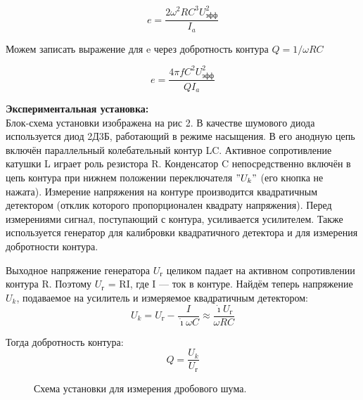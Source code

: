 \documentclass[a4paper, 12pt]{article}%
\begin{document}
	\begin{equation}
		e = \frac{2\omega^2RC^3U_{\text{эфф}}^2}{I_a}
	\end{equation}
	
	Можем записать выражение для e через добротность контура $Q = 1/\omega RC$
	
	\begin{equation}
		e = \frac{4\pi f C^2U_{\text{эфф}}^2}{QI_a}
	\end{equation}
	
	\textbf{Экспериментальная установка: }\\
	
	Блок-схема установки изображена на рис 2. В качестве шумового диода используется диод 2Д3Б, работающий в режиме насыщения. В его
	анодную цепь включён параллельный колебательный контур LC. Активное сопротивление катушки L играет роль резистора R. Конденсатор C непосредственно включён в цепь контура при нижнем положении
	переключателя $"U_k"$ (его кнопка не нажата). Измерение напряжения
	на контуре производится квадратичным детектором (отклик которого
	пропорционален квадрату напряжения). Перед измерениями сигнал, поступающий с контура, усиливается усилителем. Также используется генератор для калибровки квадратичного детектора и для измерения добротности контура.
	
	Выходное напряжение генератора $U_{\text{г}}$ целиком падает на активном сопротивлении контура R. Поэтому $U_{\text{г}}$ = RI, где I — ток в контуре. Найдём теперь напряжение $U_k$, подаваемое на усилитель и измеряемое квадратичным детектором:
	$$U_k = U_{\text{г}} - \frac{I}{\dot\imath \omega C} \approx \frac{\dot\imath U_{\text{г}}}{\omega RC}$$
	
	Тогда добротность контура:
	$$ Q =  \frac{U_k}{U_{\text{г}}}$$
	
	\begin{figure}[H]
		\caption{Схема установки для измерения дробового шума.}
	\end{figure}
	
\end{document}
